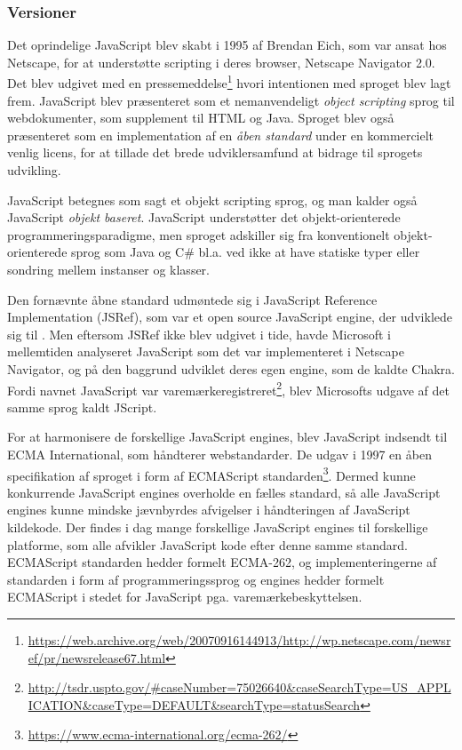 \documentclass[]{article}
\begin{document}
\hypertarget{versioner}{%
\subsubsection{Versioner}\label{versioner}}

Det oprindelige JavaScript blev skabt i 1995 af Brendan Eich, som var
ansat hos Netscape, for at understøtte scripting i deres browser,
Netscape Navigator 2.0. Det blev udgivet med en pressemeddelse\footnote{\url{https://web.archive.org/web/20070916144913/http://wp.netscape.com/newsref/pr/newsrelease67.html}}
hvori intentionen med sproget blev lagt frem. JavaScript blev
præsenteret som et nemanvendeligt \emph{object scripting} sprog til
webdokumenter, som supplement til HTML og Java. Sproget blev også
præsenteret som en implementation af en \emph{åben standard} under en
kommercielt venlig licens, for at tillade det brede udviklersamfund at
bidrage til sprogets udvikling.

JavaScript betegnes som sagt et objekt scripting sprog, og man kalder
også JavaScript \emph{objekt baseret}. JavaScript understøtter det
objekt-orienterede programmeringsparadigme, men sproget adskiller sig
fra konventionelt objekt-orienterede sprog som Java og C\# bl.a. ved
ikke at have statiske typer eller sondring mellem instanser og klasser.

Den fornævnte åbne standard udmøntede sig i JavaScript Reference
Implementation (JSRef), som var et open source JavaScript engine, der
udviklede sig til . Men eftersom JSRef ikke blev udgivet i tide, havde
Microsoft i mellemtiden analyseret JavaScript som det var implementeret
i Netscape Navigator, og på den baggrund udviklet deres egen engine, som
de kaldte Chakra. Fordi navnet JavaScript var
varemærkeregistreret\footnote{\url{http://tsdr.uspto.gov/\#caseNumber=75026640\&caseSearchType=US_APPLICATION\&caseType=DEFAULT\&searchType=statusSearch}},
blev Microsofts udgave af det samme sprog kaldt JScript.

For at harmonisere de forskellige JavaScript engines, blev JavaScript
indsendt til ECMA International, som håndterer webstandarder. De udgav i
1997 en åben specifikation af sproget i form af ECMAScript
standarden\footnote{\url{https://www.ecma-international.org/ecma-262/}}.
Dermed kunne konkurrende JavaScript engines overholde en fælles
standard, så alle JavaScript engines kunne mindske jævnbyrdes afvigelser
i håndteringen af JavaScript kildekode. Der findes i dag mange
forskellige JavaScript engines til forskellige platforme, som alle
afvikler JavaScript kode efter denne samme standard. ECMAScript
standarden hedder formelt ECMA-262, og implementeringerne af standarden
i form af programmeringssprog og engines hedder formelt ECMAScript i
stedet for JavaScript pga. varemærkebeskyttelsen.
\end{document}
